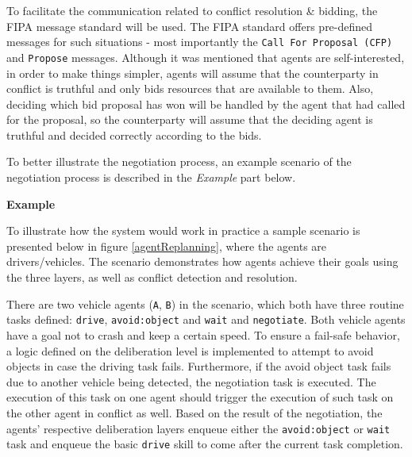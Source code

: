 \documentclass[0main.tex]{subfiles}
\begin{document}
To facilitate the communication related to conflict resolution \& bidding, the FIPA message
standard will be used.  The FIPA standard offers pre-defined messages for such situations -
most importantly the \texttt{Call For Proposal (CFP)} and \texttt{Propose} messages. Although
it was mentioned that agents are self-interested, in order to make things simpler, agents will
assume that the counterparty in conflict is truthful and only bids resources that are
available to them. Also, deciding which bid proposal has won will be handled by the agent that
had called for the proposal, so the counterparty will assume that the deciding agent is
truthful and decided correctly according to the bids. 

To better illustrate the negotiation process, an example scenario of the negotiation process is 
described in the \emph{Example} part below.

\textbf{Example}

To illustrate how the system would work in practice a sample scenario is presented below in
figure \ref{agentReplanning}, where the agents are drivers/vehicles. The scenario demonstrates 
how agents achieve their goals using the three layers, as well as conflict detection and resolution.

There are two vehicle agents (\texttt{A}, \texttt{B}) in the scenario, which both have three routine tasks defined:
\texttt{drive}, \texttt{avoid:object} and \texttt{wait} and \texttt{negotiate}. Both vehicle
agents have a goal not to crash and keep a certain speed. To ensure a fail-safe behavior, 
a logic defined on the deliberation level is implemented to attempt to avoid objects in case the driving task
fails. Furthermore, if the avoid object task fails due to another vehicle being detected, the negotiation 
task is executed. The execution of this task on one agent should trigger the execution of such task on the 
other agent in conflict as well. Based on the result of the negotiation, the agents' respective 
deliberation layers enqueue either the \texttt{avoid:object} or \texttt{wait} task and enqueue the 
basic \texttt{drive} skill to come after the current task completion.
\end{document}
